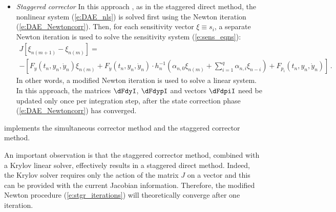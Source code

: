 \begin{itemize}
\item {\em Staggered corrector}
  In this approach \cite{FTB:97}, as in the staggered direct method,
  the nonlinear system (\ref{e:DAE_nls}) is solved first using the Newton
  iteration (\ref{e:DAE_Newtoncorr}). Then, for each sensitivity vector $\xi \equiv s_i$,
  a separate Newton iteration is used to solve the sensitivity system (\ref{e:sens_eqns}):
  \begin{multline}\label{e:stgr_iterations}
    J [\xi_{n(m+1)} - \xi_{n(m)}]= \\
    - \left[
      F_y (t_n, y_n, \dot y_n) \xi_{n(m)}
      + F_{\dot y} (t_n, y_n, \dot y_n) \cdot
      h_n^{-1} \left(
        \alpha_{n,0} \xi_{n(m)} + \sum_{i=1}^q \alpha_{n,i} \xi_{n-i}
      \right) 
      + F_{p_i} (t_n, y_n, \dot y_n)
    \right] \, .
  \end{multline}
  In other words, a modified Newton iteration is used to solve a linear system.
  In this approach, the matrices $\dFdyI$, $\dFdypI$ and vectors $\dFdpiI$ need 
  be updated only once per integration step, after the state correction phase 
  (\ref{e:DAE_Newtoncorr}) has converged.
\end{itemize}  

{\idas} implements the simultaneous corrector method and the staggered corrector method.

An important observation is that the staggered corrector method, combined with 
a Krylov linear solver, effectively results in a staggered direct method. 
Indeed, the Krylov solver requires only the action of the matrix $J$ on a vector
and this can be provided with the current Jacobian information. Therefore, the
modified Newton procedure (\ref{e:stgr_iterations}) will theoretically converge 
after one iteration.

